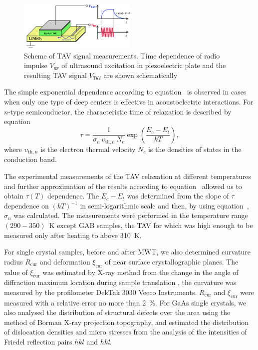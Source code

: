 \documentclass[10pt]{iopart}
\begin{document}
\begin{figure}
\includegraphics[width=0.5\textwidth]{fig2}
\caption{\label{figTAV}
Scheme of TAV signal  measurements.
Time dependence of radio impulse $V_\mathtt{RF}$ of ultrasound excitation in piezoelectric plate and the resulting TAV signal $V_\mathtt{TAV}$ are shown schematically
}%
\end{figure}

The simple exponential dependence according to equation~ is observed in cases when only one type of deep centers is effective in acoustoelectric interactions.
For $n$-type semiconductor, the characteristic time of relaxation is described by equation \cite{OstrovPAN,OstrovskiiSST}
\begin{equation}\label{eqPANtau}
  \tau=\frac{1}{\sigma_n\,\upsilon_{\mathrm{th},n}\,N_c}\exp\left(\frac{E_c-E_t}{kT}\right),
\end{equation}
where
$\upsilon_{\mathrm{th},n}$ is the electron thermal velocity
$N_c$ is the densities of states in the conduction band.



The experimental measurements of the TAV relaxation at different temperatures and further approximation of the results according
to equation~
allowed us to obtain $\tau(T)$ dependence.
The $E_c-E_t$ was determined from the slope of $\tau$ dependence on $(kT)^{-1}$ in semi-logarithmic scale
and then, by using equation~, $\sigma_n$ was calculated.
The measurements were performed in the temperature range $(290-350)$~K except GAB samples,
the TAV for which was high enough to be measured only after heating to above 310~K.

For single crystal samples,  before and after MWT, we also determined curvature radius $R_\mathrm{cur}$
and deformation $\xi_\mathrm{cur}$ of near surface crystallographic planes.
The value of  $\xi_\mathrm{cur}$ was estimated by X-ray method from the change in the angle of diffraction
maximum location  during sample translation \cite{Godwod},
the curvature was measured by the profilometer DekTak 3030 Veeco Instruments.
$R_\mathrm{cur}$ and $\xi_\mathrm{cur}$ were measured with a relative error no more than 2~\%.
For GaAs single crystals, we also analysed the distribution of structural defects over the area using the method of
Borman X-ray projection topography, and estimated the distribution of dislocation  densities and micro stresses from the
analysis of the intensities of Friedel reflection pairs $hkl$ and $hk$\emph{\={l}}.
\end{document}
